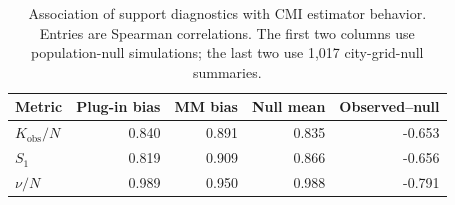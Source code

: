 \begin{table}[!htbp]
\caption{Association of support diagnostics with CMI estimator behavior. Entries are Spearman correlations. The first two columns use population-null simulations; the last two use 1,017 city-grid-null summaries.}
\label{tab:e13_support_relationships}
\centering
\begin{tabular*}{\textwidth}{@{\extracolsep{\fill}}lrrrr@{}}
\toprule
\textbf{Metric} & \textbf{Plug-in bias} & \textbf{MM bias} & \textbf{Null mean} & \textbf{Observed--null}\\
\midrule
$K_{\mathrm{obs}}/N$ & 0.840 & 0.891 & 0.835 & -0.653\\
$S_1$ & 0.819 & 0.909 & 0.866 & -0.656\\
$\nu/N$ & 0.989 & 0.950 & 0.988 & -0.791\\
\bottomrule
\end{tabular*}
\end{table}
